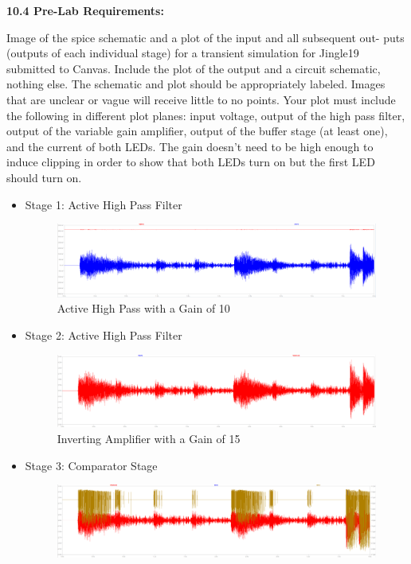 \documentclass{article}
\begin{document}
\textbf{10.4 Pre-Lab Requirements:} 

Image of the spice schematic and a plot of the input and all subsequent out-
puts (outputs of each individual stage) for a transient simulation for Jingle19
submitted to Canvas. Include the plot of the output and a circuit schematic,
nothing else. The schematic and plot should be appropriately labeled. Images
that are unclear or vague will receive little to no points. Your plot must include
the following in different plot planes: input voltage, output of the high pass
filter, output of the variable gain amplifier, output of the buffer stage (at least
one), and the current of both LEDs. The gain doesn’t need to be high enough
to induce clipping in order to show that both LEDs turn on but the first LED
should turn on.

\begin{itemize}
    \item Stage 1: Active High Pass Filter
    \begin{figure}[H]
        \centering
        \includegraphics[width=1\textwidth]{activehighplot.png}
        \caption{Active High Pass with a Gain of 10}
    \end{figure}
    \item Stage 2: Active High Pass Filter
    \begin{figure}[H]
        \centering
        \includegraphics[width=1\textwidth]{gainstage.png}
        \caption{Inverting Amplifier with a Gain of 15}
    \end{figure}
    \item Stage 3: Comparator Stage
    \begin{figure}[H]
        \centering
        \includegraphics[width=1\textwidth]{compstage.png}

\end{figure}
\end{itemize}
\end{document}
